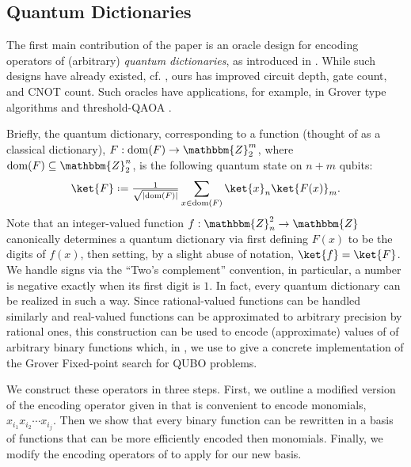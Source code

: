 \documentclass[reqno,oneside,12pt]{amsart}  %
\numberwithin{equation}{section}                %
\let\originalleft\left
\let\originalright\right
\renewcommand{\left}{\mathopen{}\mathclose\bgroup\originalleft}
\renewcommand{\right}{\aftergroup\egroup\originalright}
\def\({\mathopen{}\left(}
\def\){\right)\mathclose{}}
\newcommand*{\eqdef}{\mathrel{\vcenter{\baselineskip0.5ex \lineskiplimit0pt\hbox{.}\hbox{.}}}=}
\def\Z{\mathbbm{Z}}
\def\dom{\mathrm{dom}}
\begin{document}
\medskip

\subsection{Quantum Dictionaries}
\label{sec:qdicts}

The first main contribution of the paper is an oracle design for encoding operators of (arbitrary) \emph{quantum dictionaries}, as introduced in \cite{gilliam_foundational_2021}. While such designs have already existed, cf. \cite{gilliam_grover_2021}, ours has improved circuit depth, gate count, and CNOT count. Such oracles have applications, for example, in Grover type algorithms and threshold-QAOA \cite{golden_threshold_2021}.

Briefly, the quantum dictionary, corresponding to a function (thought of as a classical dictionary), $F: \dom \( F \) \rightarrow \Z_2^m$, where $\dom \( F \) \subseteq \Z_2^n$, is the following quantum state on $n + m$ qubits:
\begin{equation}
   \ket{F} \eqdef \tfrac{1}{\sqrt{\left| \dom \( F \) \right|}} \sum\limits_{x \in \dom \( F \)} \ket{x}_n \ket{F (x)}_m.
\end{equation}
Note that an integer-valued function $f : \Z_n^2 \rightarrow \Z$ canonically determines a quantum dictionary via first defining $F (x)$ to be the digits of $f (x)$, then setting, by a slight abuse of notation, $\ket{f} = \ket{F}$. We handle signs via the ``Two's complement'' convention, in particular, a number is negative exactly when its first digit is $1$. In fact, every quantum dictionary can be realized in such a way. Since rational-valued functions can be handled similarly and real-valued functions can be approximated to arbitrary precision by rational ones, this construction can be used to encode (approximate) values of of arbitrary binary functions which, in , we use to give a concrete implementation of the Grover Fixed-point search for QUBO problems.

We construct these operators in three steps. First, we outline a modified version of the encoding operator given in \cite{gilliam_grover_2021} that is convenient to encode monomials, $x_{i_1} x_{i_2} \cdots x_{i_j}$. Then we show that every binary function can be rewritten in a basis of functions that can be more efficiently encoded then monomials. Finally, we modify the encoding operators of \cite{gilliam_grover_2021} to apply for our new basis.

\medskip
\end{document}
